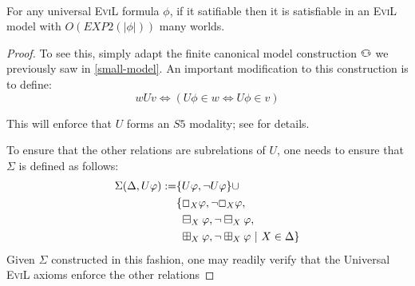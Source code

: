 \begin{theorem}\ \\
For any universal \textsc{EviL} formula $\phi$, if it satifiable then
it is satisfiable in an \textsc{EviL} model with $O(EXP2(|\phi|))$
many worlds.
\end{theorem}
\begin{proof}
To see this, simply adapt the finite canonical model construction
$\invis$ we
previously saw in \ref{small-model}.  An important modification to
this construction is to define:
\[ w U v \iff (U \phi \in w \iff U \phi \in v)\]

This will enforce that $U$ forms an $S5$ modality; see \cite[chapter
5, pgs. 81--82]{boolos_logic_1995} for details.  

To ensure that the other relations are subrelations of $U$, 
one needs to ensure that $\Sigma$ is defined as follows:
\begin{align*}
\Sigma(\Delta,U \varphi) := &   \{ U \varphi, \neg U \varphi \} \cup \\
& \{ \Box_X \varphi,\neg \Box_X \varphi, \\
& \ \boxminus_X \varphi, \neg\boxminus_X \varphi, \\
& \ \boxplus_X \varphi, \neg\boxplus_X \varphi  \ |\ X \in \Delta
\}
\end{align*}
Given $\Sigma$ constructed in this fashion, one may readily verify
that the Universal
\textsc{EviL} axioms enforce the other relations  
\end{proof}
